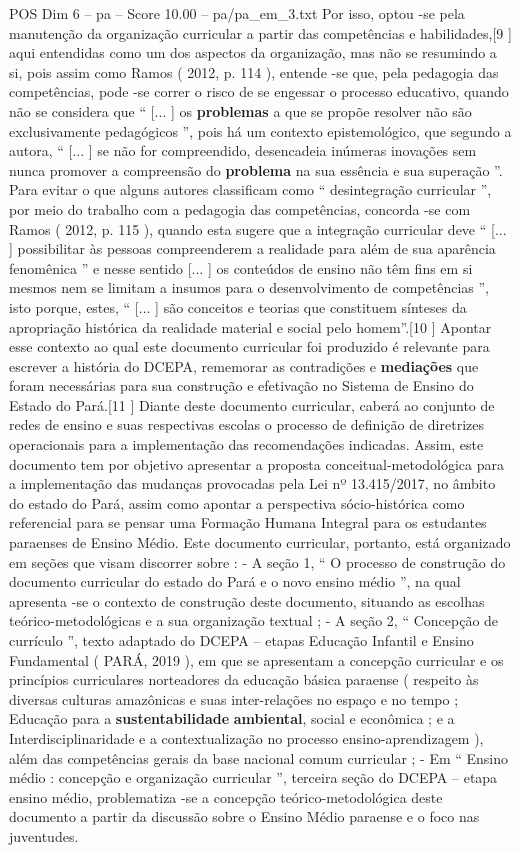 \begin{textsample}{POS Dim 6 – pa – Score 10.00 – pa/pa\_em\_3.txt}
Por isso, optou -se pela manutenção da organização curricular a partir das competências e habilidades,[9 ] aqui entendidas como um dos aspectos da organização, mas não se resumindo a si, pois assim como Ramos ( 2012, p. 114 ), entende -se que, pela pedagogia das competências, pode -se correr o risco de se engessar o processo educativo, quando não se considera que “ [... ] os \textbf{problemas} a que se propõe resolver não são exclusivamente pedagógicos ”, pois há um contexto epistemológico, que segundo a autora, “ [... ] se não for compreendido, desencadeia inúmeras inovações sem nunca promover a compreensão do \textbf{problema} na sua essência e sua superação ”.
Para evitar o que alguns autores classificam como “ desintegração curricular ”, por meio do trabalho com a pedagogia das competências, concorda -se com Ramos ( 2012, p. 115 ), quando esta sugere que a integração curricular deve “ [... ] possibilitar às pessoas compreenderem a realidade para além de sua aparência fenomênica ” e nesse sentido [... ] os conteúdos de ensino não têm fins em si mesmos nem se limitam a insumos para o desenvolvimento de competências ”, isto porque, estes, “ [... ] são conceitos e teorias que constituem sínteses da apropriação histórica da realidade material e social pelo homem”.[10 ] Apontar esse contexto ao qual este documento curricular foi produzido é relevante para escrever a história do DCEPA, rememorar as contradições e \textbf{mediações} que foram necessárias para sua construção e efetivação no Sistema de Ensino do Estado do Pará.[11 ] Diante deste documento curricular, caberá ao conjunto de redes de ensino e suas respectivas escolas o processo de definição de diretrizes operacionais para a implementação das recomendações indicadas.
Assim, este documento tem por objetivo apresentar a proposta conceitual-metodológica para a implementação das mudanças provocadas pela Lei nº 13.415/2017, no âmbito do estado do Pará, assim como apontar a perspectiva sócio-histórica como referencial para se pensar uma Formação Humana Integral para os estudantes paraenses de Ensino Médio.
Este documento curricular, portanto, está organizado em seções que visam discorrer sobre : - A seção 1, “ O processo de construção do documento curricular do estado do Pará e o novo ensino médio ”, na qual apresenta -se o contexto de construção deste documento, situando as escolhas teórico-metodológicas e a sua organização textual ; - A seção 2, “ Concepção de currículo ”, texto adaptado do DCEPA – etapas Educação Infantil e Ensino Fundamental ( PARÁ, 2019 ), em que se apresentam a concepção curricular e os princípios curriculares norteadores da educação básica paraense ( respeito às diversas culturas amazônicas e suas inter-relações no espaço e no tempo ; Educação para a \textbf{sustentabilidade} \textbf{ambiental}, social e econômica ; e a Interdisciplinaridade e a contextualização no processo ensino-aprendizagem ), além das competências gerais da base nacional comum curricular ; - Em “ Ensino médio : concepção e organização curricular ”, terceira seção do DCEPA – etapa ensino médio, problematiza -se a concepção teórico-metodológica deste documento a partir da discussão sobre o Ensino Médio paraense e o foco nas juventudes.

\end{textsample}
